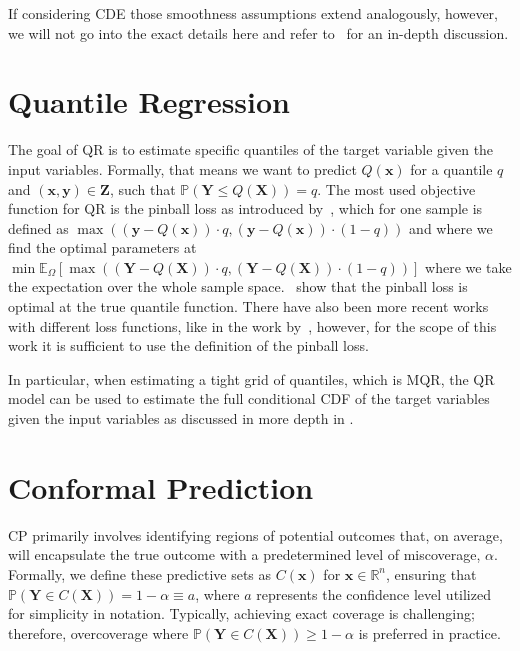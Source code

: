 If considering CDE those smoothness assumptions extend analogously, however, we will not go into the exact details here and refer to~\cite{rothfuss2019noise} for an in-depth discussion.

\section{Quantile Regression}\label{sec:qr}

The goal of QR is to estimate specific quantiles of the target variable given the input variables. Formally, that means we want to predict $Q(\mathbf{x})$ for a quantile $q$ and $(\mathbf{x}, \mathbf{y})\in\mathbf{Z}$, such that $\mathbb{P}(\mathbf{Y} \leq Q(\mathbf{X})) = q$. The most used objective function for QR is the pinball loss as introduced by~\cite{koenker1978regression}, which for one sample is defined as $\max ((\mathbf{y} - Q(\mathbf{x})) \cdot q, (\mathbf{y} - Q(\mathbf{x})) \cdot (1 - q))$ and where we find the optimal parameters at $ \min \mathbb{E}_{\Omega}\left[ \max \left((\mathbf{Y} - Q(\mathbf{X})) \cdot q, (\mathbf{Y} - Q(\mathbf{X})) \cdot (1 - q)\right)\right]$ where we take the expectation over the whole sample space.~\cite{koenker1978regression} show that the pinball loss is optimal at the true quantile function. There have also been more recent works with different loss functions, like in the work by~\cite{chung2021beyond}, however, for the scope of this work it is sufficient to use the definition of the pinball loss.

In particular, when estimating a tight grid of quantiles, which is MQR, the QR model can be used to estimate the full conditional CDF of the target variables given the input variables as discussed in more depth in .

\section{Conformal Prediction}\label{sec:cp}

CP primarily involves identifying regions of potential outcomes that, on average, will encapsulate the true outcome with a predetermined level of miscoverage, $\alpha$. Formally, we define these predictive sets as $C(\mathbf{x})$ for $\mathbf{x} \in \mathbb{R}^n$, ensuring that $\mathbb{P}(\mathbf{Y} \in C(\mathbf{X})) = 1 - \alpha \equiv a$, where $a$ represents the confidence level utilized for simplicity in notation. Typically, achieving exact coverage is challenging; therefore, overcoverage where $\mathbb{P}(\mathbf{Y} \in C(\mathbf{X})) \geq 1 - \alpha$ is preferred in practice.


